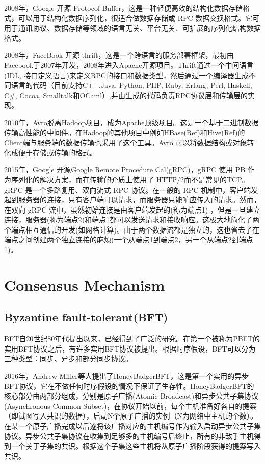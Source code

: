 \documentclass[a4paper,twoside]{scrbook}
\begin{document}
\begin{CJK}{UTF8}{gbsn}
2008年，Google 开源 Protocol Buffer，这是一种轻便高效的结构化数据存储格式，可以用于结构化数据序列化，很适合做数据存储或 RPC 数据交换格式。它可用于通讯协议、数据存储等领域的语言无关、平台无关、可扩展的序列化结构数据格式。

2008年，FaceBook 开源 thrift，这是一个跨语言的服务部署框架，最初由Facebook于2007年开发，2008年进入Apache开源项目。Thrift通过一个中间语言(IDL, 接口定义语言)来定义RPC的接口和数据类型，然后通过一个编译器生成不同语言的代码（目前支持C++,Java, Python, PHP, Ruby, Erlang, Perl, Haskell, C#, Cocoa, Smalltalk和OCaml）,并由生成的代码负责RPC协议层和传输层的实现。

2010年，Avro脱离Hadoop项目，成为Apache顶级项目。这是一个基于二进制数据传输高性能的中间件。在Hadoop的其他项目中例如HBase(Ref)和Hive(Ref)的Client端与服务端的数据传输也采用了这个工具。Avro 可以将数据结构或对象转化成便于存储或传输的格式。

2015年，Google 开源Google Remote Procedure Cal(gRPC)，gRPC 使用 PB 作为序列化的解决方案，而在传输的介质上使用了 HTTP/2而不是常见的TCP。gRPC 是一个多路复用、双向流式 RPC 协议。在一般的 RPC 机制中，客户端发起到服务器的连接，只有客户端可以请求，而服务器只能响应传入的请求。然而，在双向 gRPC 流中，虽然初始连接是由客户端发起的(称为端点1) ，但是一旦建立连接，服务器(称为端点2)和端点1都可以发送请求和接收响应。这极大地简化了两个端点相互通信的开发(如网格计算)。由于两个数据流都是独立的，这也省去了在端点之间创建两个独立连接的麻烦(一个从端点1到端点2，另一个从端点2到端点1)。

\section{Consensus Mechanism}
\subsection{Byzantine fault-tolerant(BFT)}
BFT自20世纪80年代提出以来\cite{lamport1982byzantine}，已经得到了广泛的研究。在第一个被称为PBFT\cite{castro2002practical}的实用BFT协议之后，有许多实用BFT协议被提出。根据时序假设，BFT可以分为三种类型：同步、异步和部分同步协议。

2016年，Andrew Miller等人提出了HoneyBadgerBFT\cite{miller2016honey}，这是第一个实用的异步BFT协议，它在不做任何时序假设的情况下保证了生存性。HoneyBadgerBFT的核心部分由两部分组成，分别是原子广播(Atomic Broadcast)和异步公共子集协议(Asynchronous Common Subset)，在协议开始以前，每个主机准备好各自的提案（即试图写入共识的数据），启动N个原子广播的实例（N为网络中主机的个数）。在某一个原子广播完成以后遂将该广播对应的主机编号作为输入启动异步公共子集协议。异步公共子集协议在收集到足够多的主机编号后终止，所有的非敌手主机得到一个关于子集的共识。根据这个子集这些主机将从原子广播阶段获得的提案写入共识。


\end{CJK}
\end{document}
